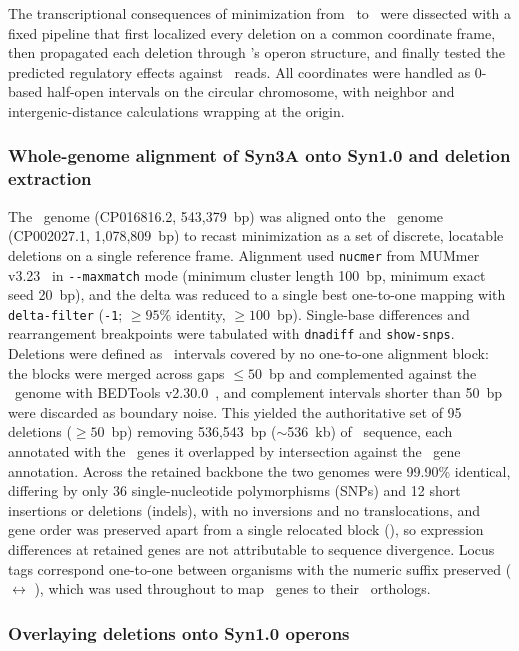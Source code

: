 The transcriptional consequences of minimization from \jsyn~to \jsyna~were dissected with a fixed pipeline that first localized every deletion on a common coordinate frame, then propagated each deletion through \syn's operon structure, and finally tested the predicted regulatory effects against \syna~reads.
All coordinates were handled as 0-based half-open intervals on the circular chromosome, with neighbor and intergenic-distance calculations wrapping at the origin.

\subsubsection{Whole-genome alignment of Syn3A onto Syn1.0 and deletion extraction}

The \syna~genome (CP016816.2, 543{,}379~bp) was aligned onto the \syn~genome (CP002027.1, 1{,}078{,}809~bp) to recast minimization as a set of discrete, locatable deletions on a single reference frame.
Alignment used \texttt{nucmer} from MUMmer v3.23~\cite{kurtz_versatile_2004} in \texttt{-{}-maxmatch} mode (minimum cluster length 100~bp, minimum exact seed 20~bp), and the delta was reduced to a single best one-to-one mapping with \texttt{delta-filter} (\texttt{-1}; $\geq 95\%$ identity, $\geq 100$~bp).
Single-base differences and rearrangement breakpoints were tabulated with \texttt{dnadiff} and \texttt{show-snps}.
Deletions were defined as \syn~intervals covered by no one-to-one alignment block: the blocks were merged across gaps $\leq 50$~bp and complemented against the \syn~genome with BEDTools v2.30.0~\cite{quinlan_bedtools_2010}, and complement intervals shorter than 50~bp were discarded as boundary noise.
This yielded the authoritative set of 95 deletions ($\geq 50$~bp) removing 536{,}543~bp ($\sim$536~kb) of \syn~sequence, each annotated with the \syn~genes it overlapped by intersection against the \syn~gene annotation.
Across the retained backbone the two genomes were 99.90\% identical, differing by only 36 single-nucleotide polymorphisms (SNPs) and 12 short insertions or deletions (indels), with no inversions and no translocations, and gene order was preserved apart from a single relocated block (), so expression differences at retained genes are not attributable to sequence divergence.
Locus tags correspond one-to-one between organisms with the numeric suffix preserved ( $\leftrightarrow$ ), which was used throughout to map \syn~genes to their \syna~orthologs.

\subsubsection{Overlaying deletions onto Syn1.0 operons}

